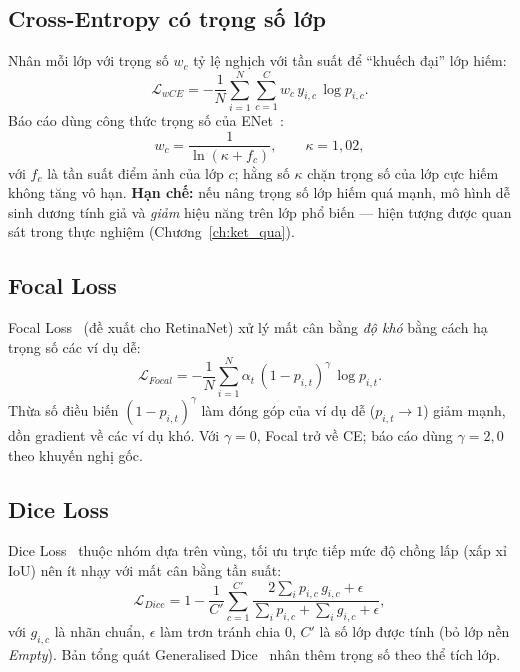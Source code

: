 \subsection{Cross-Entropy có trọng số lớp}
Nhân mỗi lớp với trọng số $w_c$ tỷ lệ nghịch với tần suất để ``khuếch đại'' lớp hiếm:
\begin{equation}
\mathcal{L}_{wCE} = -\frac{1}{N}\sum_{i=1}^{N}\sum_{c=1}^{C} w_c\, y_{i,c}\,\log p_{i,c}.
\end{equation}
Báo cáo dùng công thức trọng số của ENet~\cite{paszke2016enet}:
\begin{equation}
w_c = \frac{1}{\ln(\kappa + f_c)}, \qquad \kappa = 1{,}02,
\label{eq:enet_w}
\end{equation}
với $f_c$ là tần suất điểm ảnh của lớp $c$; hằng số $\kappa$ chặn trọng số của lớp cực
hiếm không tăng vô hạn. \textbf{Hạn chế:} nếu nâng trọng số lớp hiếm quá mạnh, mô hình
dễ sinh dương tính giả và \emph{giảm} hiệu năng trên lớp phổ biến --- hiện tượng được
quan sát trong thực nghiệm (Chương~\ref{ch:ket_qua}).

\subsection{Focal Loss}
Focal Loss~\cite{lin2017focal} (đề xuất cho RetinaNet) xử lý mất cân bằng \emph{độ khó}
bằng cách hạ trọng số các ví dụ dễ:
\begin{equation}
\mathcal{L}_{Focal} = -\frac{1}{N}\sum_{i=1}^{N}
\alpha_t\,(1 - p_{i,t})^{\gamma}\,\log p_{i,t}.
\label{eq:focal}
\end{equation}
Thừa số điều biến $(1-p_{i,t})^{\gamma}$ làm đóng góp của ví dụ dễ ($p_{i,t}\!\to\!1$)
giảm mạnh, dồn gradient về các ví dụ khó. Với $\gamma = 0$, Focal trở về CE; báo cáo
dùng $\gamma = 2{,}0$ theo khuyến nghị gốc.

\subsection{Dice Loss}
Dice Loss~\cite{milletari2016vnet} thuộc nhóm dựa trên vùng, tối ưu trực tiếp mức độ
chồng lấp (xấp xỉ IoU) nên ít nhạy với mất cân bằng tần suất:
\begin{equation}
\mathcal{L}_{Dice} = 1 - \frac{1}{C'}\sum_{c=1}^{C'}
\frac{2\sum_i p_{i,c}\,g_{i,c} + \epsilon}{\sum_i p_{i,c} + \sum_i g_{i,c} + \epsilon},
\label{eq:dice}
\end{equation}
với $g_{i,c}$ là nhãn chuẩn, $\epsilon$ làm trơn tránh chia 0, $C'$ là số lớp được tính
(bỏ lớp nền \textit{Empty}). Bản tổng quát Generalised Dice~\cite{sudre2017gdl} nhân
thêm trọng số theo thể tích lớp.

